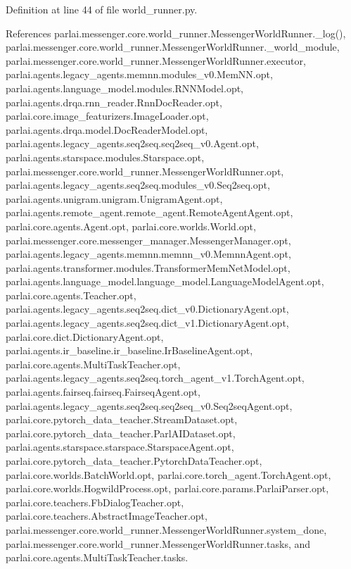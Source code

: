 Definition at line 44 of file world\+\_\+runner.\+py.



References parlai.\+messenger.\+core.\+world\+\_\+runner.\+Messenger\+World\+Runner.\+\_\+log(), parlai.\+messenger.\+core.\+world\+\_\+runner.\+Messenger\+World\+Runner.\+\_\+world\+\_\+module, parlai.\+messenger.\+core.\+world\+\_\+runner.\+Messenger\+World\+Runner.\+executor, parlai.\+agents.\+legacy\+\_\+agents.\+memnn.\+modules\+\_\+v0.\+Mem\+N\+N.\+opt, parlai.\+agents.\+language\+\_\+model.\+modules.\+R\+N\+N\+Model.\+opt, parlai.\+agents.\+drqa.\+rnn\+\_\+reader.\+Rnn\+Doc\+Reader.\+opt, parlai.\+core.\+image\+\_\+featurizers.\+Image\+Loader.\+opt, parlai.\+agents.\+drqa.\+model.\+Doc\+Reader\+Model.\+opt, parlai.\+agents.\+legacy\+\_\+agents.\+seq2seq.\+seq2seq\+\_\+v0.\+Agent.\+opt, parlai.\+agents.\+starspace.\+modules.\+Starspace.\+opt, parlai.\+messenger.\+core.\+world\+\_\+runner.\+Messenger\+World\+Runner.\+opt, parlai.\+agents.\+legacy\+\_\+agents.\+seq2seq.\+modules\+\_\+v0.\+Seq2seq.\+opt, parlai.\+agents.\+unigram.\+unigram.\+Unigram\+Agent.\+opt, parlai.\+agents.\+remote\+\_\+agent.\+remote\+\_\+agent.\+Remote\+Agent\+Agent.\+opt, parlai.\+core.\+agents.\+Agent.\+opt, parlai.\+core.\+worlds.\+World.\+opt, parlai.\+messenger.\+core.\+messenger\+\_\+manager.\+Messenger\+Manager.\+opt, parlai.\+agents.\+legacy\+\_\+agents.\+memnn.\+memnn\+\_\+v0.\+Memnn\+Agent.\+opt, parlai.\+agents.\+transformer.\+modules.\+Transformer\+Mem\+Net\+Model.\+opt, parlai.\+agents.\+language\+\_\+model.\+language\+\_\+model.\+Language\+Model\+Agent.\+opt, parlai.\+core.\+agents.\+Teacher.\+opt, parlai.\+agents.\+legacy\+\_\+agents.\+seq2seq.\+dict\+\_\+v0.\+Dictionary\+Agent.\+opt, parlai.\+agents.\+legacy\+\_\+agents.\+seq2seq.\+dict\+\_\+v1.\+Dictionary\+Agent.\+opt, parlai.\+core.\+dict.\+Dictionary\+Agent.\+opt, parlai.\+agents.\+ir\+\_\+baseline.\+ir\+\_\+baseline.\+Ir\+Baseline\+Agent.\+opt, parlai.\+core.\+agents.\+Multi\+Task\+Teacher.\+opt, parlai.\+agents.\+legacy\+\_\+agents.\+seq2seq.\+torch\+\_\+agent\+\_\+v1.\+Torch\+Agent.\+opt, parlai.\+agents.\+fairseq.\+fairseq.\+Fairseq\+Agent.\+opt, parlai.\+agents.\+legacy\+\_\+agents.\+seq2seq.\+seq2seq\+\_\+v0.\+Seq2seq\+Agent.\+opt, parlai.\+core.\+pytorch\+\_\+data\+\_\+teacher.\+Stream\+Dataset.\+opt, parlai.\+core.\+pytorch\+\_\+data\+\_\+teacher.\+Parl\+A\+I\+Dataset.\+opt, parlai.\+agents.\+starspace.\+starspace.\+Starspace\+Agent.\+opt, parlai.\+core.\+pytorch\+\_\+data\+\_\+teacher.\+Pytorch\+Data\+Teacher.\+opt, parlai.\+core.\+worlds.\+Batch\+World.\+opt, parlai.\+core.\+torch\+\_\+agent.\+Torch\+Agent.\+opt, parlai.\+core.\+worlds.\+Hogwild\+Process.\+opt, parlai.\+core.\+params.\+Parlai\+Parser.\+opt, parlai.\+core.\+teachers.\+Fb\+Dialog\+Teacher.\+opt, parlai.\+core.\+teachers.\+Abstract\+Image\+Teacher.\+opt, parlai.\+messenger.\+core.\+world\+\_\+runner.\+Messenger\+World\+Runner.\+system\+\_\+done, parlai.\+messenger.\+core.\+world\+\_\+runner.\+Messenger\+World\+Runner.\+tasks, and parlai.\+core.\+agents.\+Multi\+Task\+Teacher.\+tasks.

